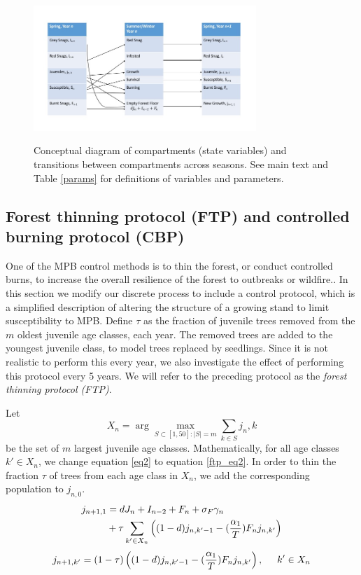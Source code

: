 \begin{figure}
\includegraphics[width = 0.75\textwidth]{chapter_3/table.jpg}
\caption{Conceptual diagram of compartments (state variables) and transitions between compartments across seasons.  See main text and Table \ref{params} for definitions of variables and parameters.}
\protect \label{diagram}
\end{figure}

\subsection{Forest thinning protocol (FTP) and controlled burning protocol (CBP)}


One of the MPB control methods is to thin the forest, or conduct controlled burns, to increase the overall resilience of the forest to outbreaks or wildfire.\cite{safranyik2001effects,sartwell1975,amman1998silvicultural}.  {In this section we modify our discrete process to include a control protocol, which is a simplified description of altering the structure of a growing stand to limit susceptibility to MPB. Define $\tau$ as the fraction of juvenile trees removed from the $m$ oldest juvenile age classes, each year. The removed trees are added to the youngest juvenile class, to model trees replaced by seedlings. Since it is not realistic to perform this every year, we also investigate the effect of performing this protocol every 5 years. We will refer to the preceding protocol as the \emph{forest thinning protocol (FTP)}.}

Let $$X_n = \arg \max_{S \subset [1,50]: |S| = m} \sum_{k \in S} j_n,k$$ be the set of $m$ largest juvenile age classes. Mathematically, for all age classes $k' \in X_n$, we change equation \ref{eq2} to equation \ref{ftp_eq2}. In order to thin the fraction $\tau$ of trees from each age class in $X_n$, we add the corresponding population to $j_{n,0}$.
\begin{align}
  j_{n+1,1} &= d J_n + I_{n-2} + F_n + \sigma_F \gamma_n \\ &+ \tau\sum_{k' \in X_n}\left((1-d) j_{n, k' - 1} - (\frac{\alpha_1}{T}) F_n j_{n,k'}\right)  \protect \label{ftp_eq1}
\end{align}
\begin{equation}
  j_{n+1, k'} = (1-\tau)\left((1-d) j_{n, k' - 1} - (\frac{\alpha_1}{T}) F_n j_{n,k'}\right),\hspace{0.5cm} k'\in X_n  \protect \label{ftp_eq2}
\end{equation}

